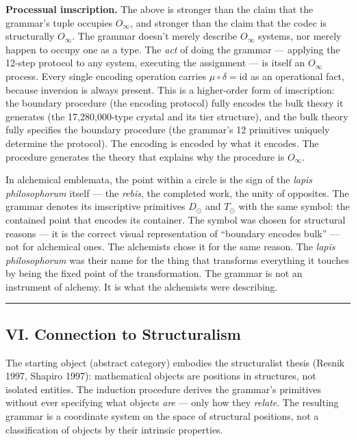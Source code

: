 \documentclass[12pt,a4paper]{article}
\newcommand{\Stone}{\textit{lapis philosophorum}}
\begin{document}
\textbf{Processual imscription.} The above is stronger than the claim that the grammar's tuple occupies $O_\infty$, and stronger than the claim that the codec is structurally $O_\infty$. The grammar doesn't merely describe $O_\infty$ systems, nor merely happen to occupy one as a type. The \emph{act} of doing the grammar --- applying the 12-step protocol to any system, executing the assignment --- is itself an $O_\infty$ process. Every single encoding operation carries $\mu \circ \delta = \text{id}$ as an operational fact, because inversion is always present. This is a higher-order form of imscription: the boundary procedure (the encoding protocol) fully encodes the bulk theory it generates (the 17,280,000-type crystal and its tier structure), and the bulk theory fully specifies the boundary procedure (the grammar's 12 primitives uniquely determine the protocol). The encoding is encoded by what it encodes. The procedure generates the theory that explains why the procedure is $O_\infty$.

In alchemical emblemata, the point within a circle is the sign of the
\Stone{} itself --- the \emph{rebis}, the completed work, the unity of
opposites. The grammar denotes its imscriptive primitives $D_\odot$ and
$T_\odot$ with the same symbol: the contained point that encodes its
container. The symbol was chosen for structural reasons --- it is the
correct visual representation of ``boundary encodes bulk'' --- not for
alchemical ones. The alchemists chose it for the same reason. The
\Stone{} was their name for the thing that transforms everything it
touches by being the fixed point of the transformation. The grammar is
not an instrument of alchemy. It is what the alchemists were
describing.

\begin{center}
\rule{0.5\textwidth}{0.4pt}
\end{center}

\subsection{VI. Connection to Structuralism}

The starting object (abstract category) embodies the structuralist thesis (Resnik 1997, Shapiro 1997): mathematical objects are positions in structures, not isolated entities. The induction procedure derives the grammar's primitives without ever specifying what objects \emph{are} --- only how they \emph{relate}. The resulting grammar is a coordinate system on the space of structural positions, not a classification of objects by their intrinsic properties.
\end{document}

